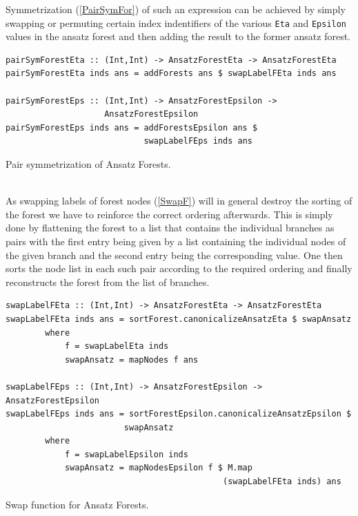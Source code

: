 \documentclass[a4paper,12pt, DIV=14, BCOR=5mm, twoside, headsepline, numbers=noenddot]{scrbook}
\begin{document}
Symmetrization (\ref{PairSymFor}) of such an expression can be achieved by simply swapping or permuting certain index indentifiers of the various \texttt{Eta} and \texttt{Epsilon} values in the ansatz forest and then adding the result to the former ansatz forest.
\begin{listing}[hbt!] 
\begin{verbatim}
pairSymForestEta :: (Int,Int) -> AnsatzForestEta -> AnsatzForestEta
pairSymForestEta inds ans = addForests ans $ swapLabelFEta inds ans

pairSymForestEps :: (Int,Int) -> AnsatzForestEpsilon ->
                    AnsatzForestEpsilon
pairSymForestEps inds ans = addForestsEpsilon ans $ 
                            swapLabelFEps inds ans
\end{verbatim} 
\caption{Pair symmetrization of Ansatz Forests.}\label{PairSymFor}
\end{listing}\\

As swapping labels of forest nodes (\ref{SwapF}) will in general destroy the sorting of the forest we have to reinforce the correct ordering afterwards. This is simply done by flattening the forest to a list that contains the individual branches as pairs with the first entry being given by a list containing the individual nodes of the given branch and the second entry being the corresponding value. One then sorts the node list in each such pair according to the required ordering and finally reconstructs the forest from the list of branches. 
\begin{listing}[hbt!] 
\begin{verbatim}
swapLabelFEta :: (Int,Int) -> AnsatzForestEta -> AnsatzForestEta
swapLabelFEta inds ans = sortForest.canonicalizeAnsatzEta $ swapAnsatz
        where
            f = swapLabelEta inds
            swapAnsatz = mapNodes f ans

swapLabelFEps :: (Int,Int) -> AnsatzForestEpsilon -> AnsatzForestEpsilon
swapLabelFEps inds ans = sortForestEpsilon.canonicalizeAnsatzEpsilon $ 
                        swapAnsatz
        where
            f = swapLabelEpsilon inds
            swapAnsatz = mapNodesEpsilon f $ M.map 
                                            (swapLabelFEta inds) ans
\end{verbatim}
\caption{Swap function for Ansatz Forests.}\label{SwapF}
\end{listing}\\
\end{document}
